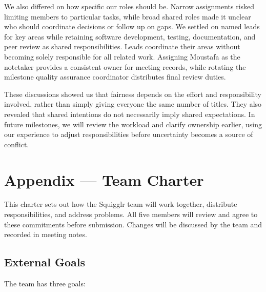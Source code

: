 \documentclass{article}
\begin{document}
\begin{enumerate}
    We also differed on how specific our roles should be. Narrow assignments
    risked limiting members to particular tasks, while broad shared roles
    made it unclear who should coordinate decisions or follow up on gaps.
    We settled on named leads for key areas while retaining software
    development, testing, documentation, and peer review as shared
    responsibilities. Leads coordinate their areas without becoming solely
    responsible for all related work. Assigning Moustafa as the notetaker
    provides a consistent owner for meeting records, while rotating the
    milestone quality assurance coordinator distributes final review duties.

    These discussions showed us that fairness depends on the effort and
    responsibility involved, rather than simply giving everyone the same
    number of titles. They also revealed that shared intentions do not
    necessarily imply shared expectations. In future milestones, we will
    review the workload and clarify ownership earlier, using our experience
    to adjust responsibilities before uncertainty becomes a source of
    conflict.

\end{enumerate}

\newpage{}

\section*{Appendix --- Team Charter}
\hypertarget{app:team-charter}{}

This charter sets out how the Squigglr team will work together,
distribute responsibilities, and address problems. All five members
will review and agree to these commitments before submission.
Changes will be discussed by the team and recorded in meeting notes.

\subsection*{External Goals}

The team has three goals:
\end{document}
